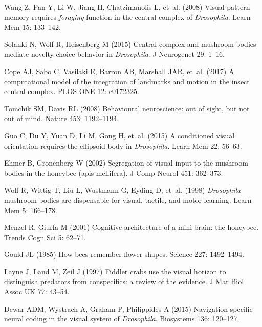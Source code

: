 \begin{thebibliography}{10}
	Wang Z, Pan Y, Li W, Jiang H, Chatzimanolis L, et~al. (2008) Visual pattern
	memory requires \emph{foraging} function in the central complex of
	\emph{Drosophila}.
	\newblock Learn Mem 15: 133--142.
	
	Solanki N, Wolf R, Heisenberg M (2015) Central complex and mushroom bodies
	mediate novelty choice behavior in \emph{Drosophila}.
	\newblock J Neurogenet 29: 1--16.
	
	Cope AJ, Sabo C, Vasilaki E, Barron AB, Marshall JAR, et~al. (2017) {A
		computational model of the integration of landmarks and motion in the insect
		central complex}.
	\newblock PLOS ONE 12: e0172325.
	
	Tomchik SM, Davis RL (2008) Behavioural neuroscience: out of sight, but not out
	of mind.
	\newblock Nature 453: 1192--1194.
	
	Guo C, Du Y, Yuan D, Li M, Gong H, et~al. (2015) A conditioned visual
	orientation requires the ellipsoid body in \emph{Drosophila}.
	\newblock Learn Mem 22: 56--63.
	
	Ehmer B, Gronenberg W (2002) Segregation of visual input to the mushroom bodies
	in the honeybee (apis mellifera).
	\newblock J Comp Neurol 451: 362--373.
	
	Wolf R, Wittig T, Liu L, Wustmann G, Eyding D, et~al. (1998) \emph{Drosophila}
	mushroom bodies are dispensable for visual, tactile, and motor learning.
	\newblock Learn Mem 5: 166--178.
	
	Menzel R, Giurfa M (2001) Cognitive architecture of a mini-brain: the honeybee.
	\newblock Trends Cogn Sci 5: 62--71.
	
	Gould JL (1985) How bees remember flower shapes.
	\newblock Science 227: 1492--1494.
	
	Layne J, Land M, Zeil J (1997) Fiddler crabs use the visual horizon to
	distinguish predators from conspecifics: a review of the evidence.
	\newblock J Mar Biol Assoc UK 77: 43--54.
	
	Dewar ADM, Wystrach A, Graham P, Philippides A (2015) Navigation-specific
	neural coding in the visual system of \emph{Drosophila}.
	\newblock Biosystems 136: 120--127.
	

\end{thebibliography}
